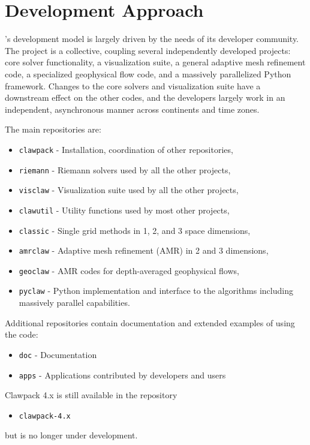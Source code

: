 %
%
%

\section{Development Approach}

\clawpack's development model is largely driven by the needs of its
developer community.  The \clawpack project is a collective, coupling several
independently developed projects: core solver functionality, a
visualization suite, a general adaptive mesh refinement code, a
specialized geophysical flow code, and a massively parallelized Python
framework.  Changes to the core solvers and visualization suite have a
downstream effect on the other codes, and the developers largely work
in an independent, asynchronous manner across continents and time
zones.

The main \clawpack repositories are:
\begin{itemize}
    \item \texttt{clawpack} - Installation, coordination of other repositories,
    \item \texttt{riemann} - Riemann solvers used by all the other projects,
    \item \texttt{visclaw} - Visualization suite used by all the other projects,
    \item \texttt{clawutil} - Utility functions used by most other projects,
    \item \texttt{classic} - Single grid methods in 1, 2, and 3 space
    dimensions,
    \item \texttt{amrclaw} - Adaptive mesh refinement (AMR) in 2 and 3 dimensions,
    \item \texttt{geoclaw} - AMR codes for depth-averaged geophysical flows,
    \item \texttt{pyclaw} - Python implementation and interface to the \clawpack algorithms including massively parallel capabilities.
\end{itemize}

Additional repositories contain documentation and extended examples of
using the code: 
\begin{itemize}
    \item \texttt{doc} - Documentation
    \item \texttt{apps} - Applications contributed by developers and users
\end{itemize}
Clawpack 4.x is still available in the repository
\begin{itemize}
    \item \texttt{clawpack-4.x}
\end{itemize}
but is no longer under development.

